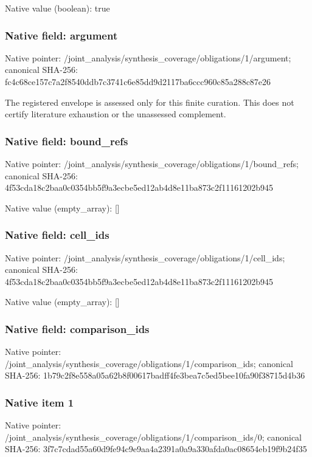 \documentclass[10pt,a4paper]{article}
\begin{document}
Native value (boolean): true

\subsubsection{Native field: argument}
Native pointer: /joint\_\allowbreak{}analysis/synthesis\_\allowbreak{}coverage/obligations/1/argument; canonical SHA-256: fc4c68ce157c7a2f8540ddb7c3741c6e85dd9d2117ba6ccc960c85a288c87e26

\begingroup\raggedright\sloppy The registered envelope is assessed only for this finite curation. This does not certify literature exhaustion or the unassessed complement.\par\endgroup

\subsubsection{Native field: bound\_\allowbreak{}refs}
Native pointer: /joint\_\allowbreak{}analysis/synthesis\_\allowbreak{}coverage/obligations/1/bound\_\allowbreak{}refs; canonical SHA-256: 4f53cda18c2baa0c0354bb5f9a3ecbe5ed12ab4d8e11ba873c2f11161202b945

Native value (empty\_\allowbreak{}array): []

\subsubsection{Native field: cell\_\allowbreak{}ids}
Native pointer: /joint\_\allowbreak{}analysis/synthesis\_\allowbreak{}coverage/obligations/1/cell\_\allowbreak{}ids; canonical SHA-256: 4f53cda18c2baa0c0354bb5f9a3ecbe5ed12ab4d8e11ba873c2f11161202b945

Native value (empty\_\allowbreak{}array): []

\subsubsection{Native field: comparison\_\allowbreak{}ids}
Native pointer: /joint\_\allowbreak{}analysis/synthesis\_\allowbreak{}coverage/obligations/1/comparison\_\allowbreak{}ids; canonical SHA-256: 1b79c2f8e558a05a62b8f00617badff4fe3bea7c5ed5bee10fa90f38715d4b36

\subsubsection{Native item 1}
Native pointer: /joint\_\allowbreak{}analysis/synthesis\_\allowbreak{}coverage/obligations/1/comparison\_\allowbreak{}ids/0; canonical SHA-256: 3f7c7cdad55a60d9fe94c9e9aa4a2391a0a9a330afda0ac08654eb19f9b24f35
\end{document}
